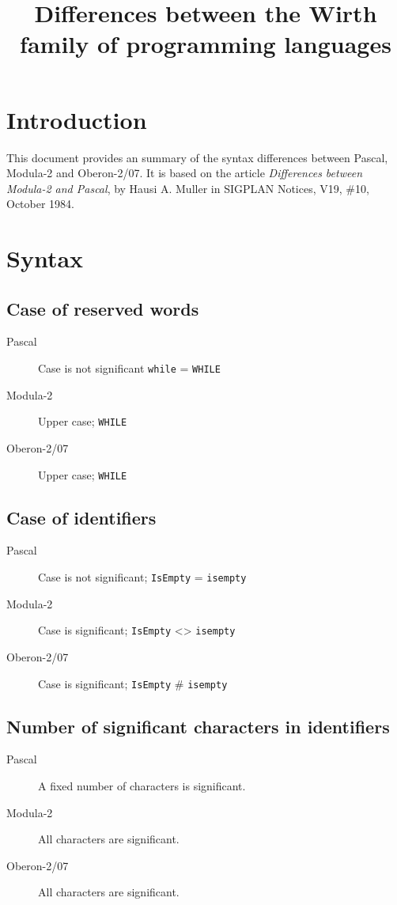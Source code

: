 \documentclass[10pt]{article}
\title{Differences between the Wirth family of programming languages}
\begin{document}
    
\maketitle

\section{Introduction}

This document provides an summary of the syntax differences between Pascal, Modula-2 and Oberon-2/07. It is based on the article {\em Differences between Modula-2 and Pascal}, by Hausi A. Muller in SIGPLAN Notices, V19, \#10, October 1984.

\section{Syntax}

\subsection{Case of reserved words}
\begin{description}
    \item[Pascal] Case is not significant \lstinline!while! = \lstinline!WHILE! 
    \item[Modula-2] Upper case; \lstinline!WHILE! 
    \item[Oberon-2/07] Upper case; \lstinline!WHILE!
\end{description}

\subsection{Case of identifiers}
\begin{description}
    \item[Pascal] Case is not significant; \lstinline!IsEmpty! = \lstinline!isempty! 
    \item[Modula-2] Case is significant; \lstinline!IsEmpty! <> \lstinline!isempty! 
    \item[Oberon-2/07] Case is significant; \lstinline!IsEmpty! \# \lstinline!isempty!
\end{description}

\subsection{Number of significant characters in identifiers}
\begin{description}
    \item[Pascal] A fixed number of characters is significant.
    \item[Modula-2] All characters are significant.
    \item[Oberon-2/07] All characters are significant.
\end{description}
\end{document}
